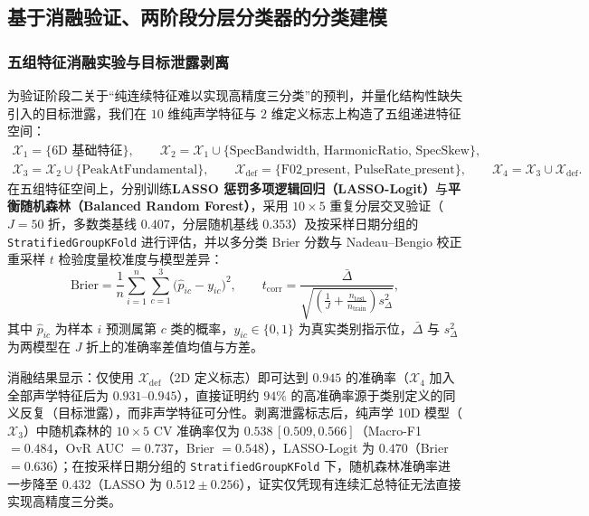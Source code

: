 \documentclass{apmcmthesis}
\begin{document}
\subsection{基于消融验证、两阶段分层分类器的分类建模}

\subsubsection{五组特征消融实验与目标泄露剥离}

为验证阶段二关于``纯连续特征难以实现高精度三分类''的预判，并量化结构性缺失引入的目标泄露，我们在 $10$ 维纯声学特征与 $2$ 维定义标志上构造了五组递进特征空间：
\begin{equation}
    \begin{gathered}
        \mathcal{X}_1 = \{\text{6D 基础特征}\},\qquad
        \mathcal{X}_2 = \mathcal{X}_1 \cup \{\text{SpecBandwidth, HarmonicRatio, SpecSkew}\}, \\
        \mathcal{X}_3 = \mathcal{X}_2 \cup \{\text{PeakAtFundamental}\},\qquad
        \mathcal{X}_{\text{def}} = \{\text{F02\_present, PulseRate\_present}\},\qquad
        \mathcal{X}_4 = \mathcal{X}_3 \cup \mathcal{X}_{\text{def}}.
    \end{gathered}
\end{equation}
在五组特征空间上，分别训练\textbf{LASSO 惩罚多项逻辑回归（LASSO-Logit）}与\textbf{平衡随机森林（Balanced Random Forest）}，采用 $10 \times 5$ 重复分层交叉验证（$J=50$ 折，多数类基线 $0.407$，分层随机基线 $0.353$）及按采样日期分组的 \texttt{StratifiedGroupKFold} 进行评估，并以多分类 Brier 分数与 Nadeau--Bengio 校正重采样 $t$ 检验度量校准度与模型差异：
\begin{equation}
    \text{Brier} = \frac{1}{n}\sum_{i=1}^{n}\sum_{c=1}^{3}\bigl(\hat{p}_{ic} - y_{ic}\bigr)^2, \qquad
    t_{\text{corr}} = \frac{\bar{\Delta}}{\sqrt{\left(\frac{1}{J} + \frac{n_{\text{test}}}{n_{\text{train}}}\right) s_\Delta^2}},
\end{equation}
其中 $\hat{p}_{ic}$ 为样本 $i$ 预测属第 $c$ 类的概率，$y_{ic} \in \{0,1\}$ 为真实类别指示位，$\bar{\Delta}$ 与 $s_\Delta^2$ 为两模型在 $J$ 折上的准确率差值均值与方差。

消融结果显示：仅使用 $\mathcal{X}_{\text{def}}$（2D 定义标志）即可达到 $0.945$ 的准确率（$\mathcal{X}_4$ 加入全部声学特征后为 $0.931$--$0.945$），直接证明约 $94\%$ 的高准确率源于类别定义的同义反复（目标泄露），而非声学特征可分性。剥离泄露标志后，纯声学 10D 模型（$\mathcal{X}_3$）中随机森林的 $10 \times 5$ CV 准确率仅为 $0.538\,[0.509, 0.566]$（Macro-F1 $= 0.484$，OvR AUC $= 0.737$，Brier $= 0.548$），LASSO-Logit 为 $0.470$（Brier $= 0.636$）；在按采样日期分组的 \texttt{StratifiedGroupKFold} 下，随机森林准确率进一步降至 $0.432$（LASSO 为 $0.512 \pm 0.256$），证实仅凭现有连续汇总特征无法直接实现高精度三分类。
\end{document}
